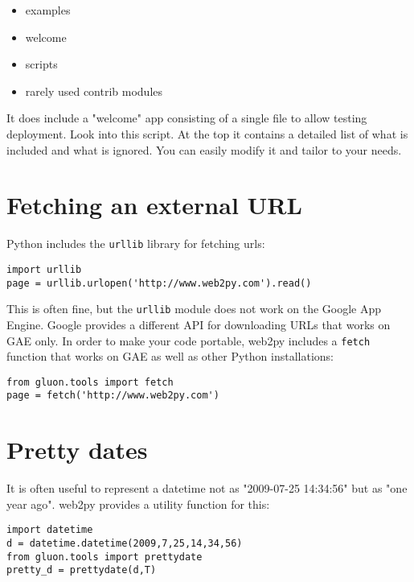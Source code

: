 \documentclass[justified,sixbynine,notoc]{tufte-book}
\def\ft{\small\tt}
\def\inxx#1{\index{#1}}
\begin{document}
\begin{fullwidth}
\begin{itemize}
\item examples

\item welcome

\item scripts

\item rarely used contrib modules
\end{itemize}

It does include a "welcome" app consisting of a single file to allow testing deployment.
Look into this script. At the top it contains a detailed list of what is included and what is ignored. You can easily modify it and tailor to your needs.

\goodbreak\section{Fetching an external URL}

\inxx{fetch}

Python includes the {\ft urllib} library for fetching urls:
\begin{lstlisting}
import urllib
page = urllib.urlopen('http://www.web2py.com').read()
\end{lstlisting}

\inxx{API}

This is often fine, but the {\ft urllib} module does not work on the Google App Engine. Google provides a different API for downloading URLs that works on GAE only. In order to make your code portable, web2py includes a {\ft fetch} function that works on GAE as well as other Python installations:
\begin{lstlisting}
from gluon.tools import fetch
page = fetch('http://www.web2py.com')
\end{lstlisting}

\goodbreak\section{Pretty dates}

\inxx{prettydate}

It is often useful to represent a datetime not as "2009-07-25 14:34:56" but as "one year ago". web2py provides a utility function for this:
\begin{lstlisting}
import datetime
d = datetime.datetime(2009,7,25,14,34,56)
from gluon.tools import prettydate
pretty_d = prettydate(d,T)
\end{lstlisting}


\end{fullwidth}
\end{document}
